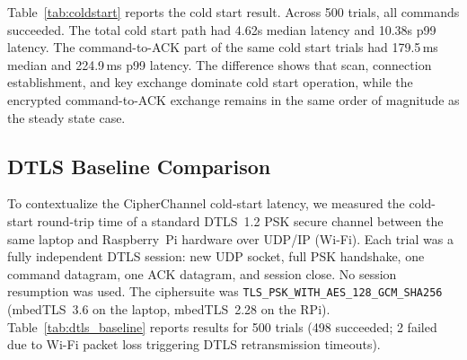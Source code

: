 \documentclass[journal]{IEEEtran}
\begin{document}
Table~\ref{tab:coldstart} reports the cold start result. Across 500 trials, all commands succeeded. The total cold start path had 4.62s median latency and 10.38s p99 latency. The command-to-ACK part of the same cold start trials had 179.5\,ms  median and 224.9\,ms  p99 latency. The difference shows that scan, connection establishment, and key exchange dominate cold start operation, while the encrypted command-to-ACK exchange remains in the same order of magnitude as the steady state case.

\begin{table}[!t]
\renewcommand{\arraystretch}{1.15}
\setlength{\tabcolsep}{3pt}
\caption{Cold Start Provisioning and First-Command Latency (ms, $N=500$)}
\label{tab:coldstart}
\centering
{}
\end{table}

\subsection{DTLS Baseline Comparison}
\label{sec:dtls-baseline}

To contextualize the CipherChannel cold-start latency, we measured the cold-start round-trip time of a standard DTLS~1.2 PSK secure channel between the same laptop and Raspberry~Pi hardware over UDP/IP (Wi-Fi). Each trial was a fully independent DTLS session: new UDP socket, full PSK handshake, one command datagram, one ACK datagram, and session close. No session resumption was used. The ciphersuite was \texttt{TLS\_PSK\_WITH\_AES\_128\_GCM\_SHA256} (mbedTLS~3.6 on the laptop, mbedTLS~2.28 on the RPi). Table~\ref{tab:dtls_baseline} reports results for 500 trials (498 succeeded; 2 failed due to Wi-Fi packet loss triggering DTLS retransmission timeouts).
\end{document}
